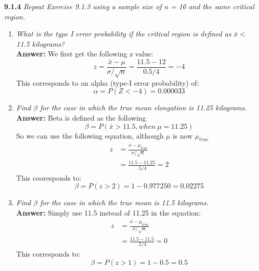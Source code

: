 \documentclass[11pt]{article}
\begin{document}
\noindent \textbf{9.1.4} \emph{ Repeat Exercise 9.1.3 using a sample size of n = 16 and the same critical region.}
\begin{enumerate}
\item \emph{What is the type I error probability if the critical region is defined as $\bar{x} <$ 11.5 kilograms?}
\\\textbf{Answer:}
We first get the following z value:
\begin{equation}
z = \frac{\bar{x} - \mu}{\sigma/\sqrt{n}} = \frac{11.5 - 12}{0.5/4} = -4
\end{equation}
This corresponds to an alpha (type-I error probability) of:
\begin{equation}
\alpha = P(Z < -4) = 0.000033
\end{equation}
\item \emph{Find $\beta$ for the case in which the true mean elongation is 11.25 kilograms.}
\\\textbf{Answer:}
Beta is defined as the following
\begin{equation}
\beta = P(\bar{x} > 11.5, when\ \mu =11.25)
\end{equation}
So we can use the following equation, although $\mu$ is now $\mu_{true}$
\begin{equation}
\begin{split}
z &= \frac{\bar{x} - \mu_{true}}{\sigma/\sqrt{n}}\\
&= \frac{11.5 - 11.25}{.5/4} = 2
\end{split}
\end{equation}
This cooresponds to:
\begin{equation}
\beta = P(z > 2) =  1 - 0.977250 = 0.02275
\end{equation}
\item \emph{Find $\beta$ for the case in which the true mean is 11.5 kilograms.}
\\\textbf{Answer:}
Simply use 11.5 instead of 11.25 in the equation:
\begin{equation}
\begin{split}
z &= \frac{\bar{x} - \mu_{true}}{\sigma/\sqrt{n}}\\
&= \frac{11.5 - 11.5}{.5/4} = 0
\end{split}
\end{equation}
This corresponds to: 
\begin{equation}
\beta = P(z > 1) = 1 - 0.5 =0.5
\end{equation}
\end{enumerate}
\end{document}
